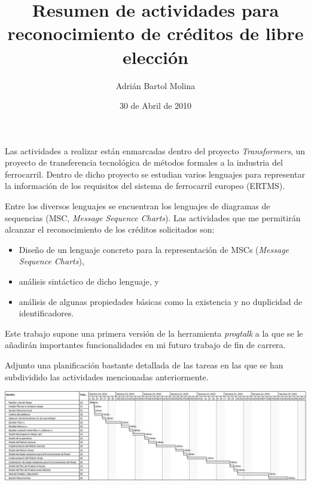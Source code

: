 \documentclass{article}
\title{Resumen de actividades para reconocimiento de créditos de libre elección}
\author{Adrián Bartol Molina}
\date{30 de Abril de 2010}
\begin{document}
\maketitle

Las actividades a realizar están enmarcadas dentro del proyecto
\emph{Transformers}, un proyecto de transferencia tecnológica de
métodos formales a la industria del ferrocarril. Dentro de dicho
proyecto se estudian varios lenguajes para representar la información
de los requisitos del sistema de ferrocarril europeo (ERTMS).

Entre los diversos lenguajes se encuentran los lenguajes de diagramas
de sequencias (MSC, \emph{Message Sequence Charts}). Las actividades
que me permitirán alcanzar el reconocimiento de los créditos
solicitados son:
\begin{itemize}
\item Diseño de un lenguaje concreto para la representación de MSCs (\emph{Message Sequence Charts}),
\item análisis sintáctico de dicho lenguaje, y
\item análisis de algunas propiedades básicas como la existencia y no duplicidad de identificadores.
\end{itemize}

Este trabajo supone una primera versión de la herramienta
\emph{progtalk} a la que se le añadirán importantes funcionalidades en
mi futuro trabajo de fin de carrera.

Adjunto una planificación bastante detallada de las tareas en las
que se han subdividido las actividades mencionadas anteriormente.

\newpage
\includegraphics[angle=90,scale=0.7]{planner}
\end{document}
